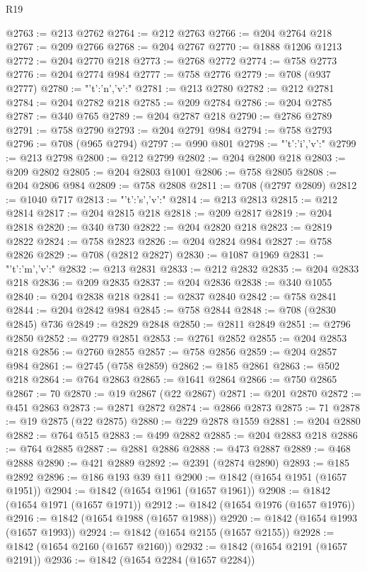 \begin{lexlean}{R19}
\begin{coremodule}
{{{{{{{@2763 := @213 @2762
@2764 := @212 @2763
@2766 := @204 @2764 @218
@2767 := @209 @2766
@2768 := @204 @2767
@2770 := @1888 @1206 @1213
@2772 := @204 @2770 @218
@2773 := @2768 @2772
@2774 := @758 @2773
@2776 := @204 @2774 @984
@2777 := @758 @2776
@2779 := @708 (@937 @2777)
@2780 := "{'t':'n','v':"
@2781 := @213 @2780
@2782 := @212 @2781
@2784 := @204 @2782 @218
@2785 := @209 @2784
@2786 := @204 @2785
@2787 := @340 @765
@2789 := @204 @2787 @218
@2790 := @2786 @2789
@2791 := @758 @2790
@2793 := @204 @2791 @984
@2794 := @758 @2793
@2796 := @708 (@965 @2794)
@2797 := @990 @801
@2798 := "{'t':'i','v':"
@2799 := @213 @2798
@2800 := @212 @2799
@2802 := @204 @2800 @218
@2803 := @209 @2802
@2805 := @204 @2803 @1001
@2806 := @758 @2805
@2808 := @204 @2806 @984
@2809 := @758 @2808
@2811 := @708 (@2797 @2809)
@2812 := @1040 @717
@2813 := "{'t':'s','v':"
@2814 := @213 @2813
@2815 := @212 @2814
@2817 := @204 @2815 @218
@2818 := @209 @2817
@2819 := @204 @2818
@2820 := @340 @730
@2822 := @204 @2820 @218
@2823 := @2819 @2822
@2824 := @758 @2823
@2826 := @204 @2824 @984
@2827 := @758 @2826
@2829 := @708 (@2812 @2827)
@2830 := @1087 @1969
@2831 := "{'t':'m','v':"
@2832 := @213 @2831
@2833 := @212 @2832
@2835 := @204 @2833 @218
@2836 := @209 @2835
@2837 := @204 @2836
@2838 := @340 @1055
@2840 := @204 @2838 @218
@2841 := @2837 @2840
@2842 := @758 @2841
@2844 := @204 @2842 @984
@2845 := @758 @2844
@2848 := @708 (@2830 @2845) @736
@2849 := @2829 @2848
@2850 := @2811 @2849
@2851 := @2796 @2850
@2852 := @2779 @2851
@2853 := @2761 @2852
@2855 := @204 @2853 @218
@2856 := @2760 @2855
@2857 := @758 @2856
@2859 := @204 @2857 @984
@2861 := @2745 (@758 @2859)
@2862 := @185 @2861
@2863 := @502 @218
@2864 := @764 @2863
@2865 := @1641 @2864
@2866 := @750 @2865
@2867 := 70
@2870 := @19 @2867 (@22 @2867)
@2871 := @201 @2870
@2872 := @451 @2863
@2873 := @2871 @2872
@2874 := @2866 @2873
@2875 := 71
@2878 := @19 @2875 (@22 @2875)
@2880 := @229 @2878 @1559
@2881 := @204 @2880
@2882 := @764 @515
@2883 := @499 @2882
@2885 := @204 @2883 @218
@2886 := @764 @2885
@2887 := @2881 @2886
@2888 := @473 @2887
@2889 := @468 @2888
@2890 := @421 @2889
@2892 := @2391 (@2874 @2890)
@2893 := @185 @2892
@2896 := @186 @193 @39 @11
@2900 := @1842 (@1654 @1951 (@1657 @1951))
@2904 := @1842 (@1654 @1961 (@1657 @1961))
@2908 := @1842 (@1654 @1971 (@1657 @1971))
@2912 := @1842 (@1654 @1976 (@1657 @1976))
@2916 := @1842 (@1654 @1988 (@1657 @1988))
@2920 := @1842 (@1654 @1993 (@1657 @1993))
@2924 := @1842 (@1654 @2155 (@1657 @2155))
@2928 := @1842 (@1654 @2160 (@1657 @2160))
@2932 := @1842 (@1654 @2191 (@1657 @2191))
@2936 := @1842 (@1654 @2284 (@1657 @2284))
}}}}}}}}}}}
\end{coremodule}
\end{lexlean}

